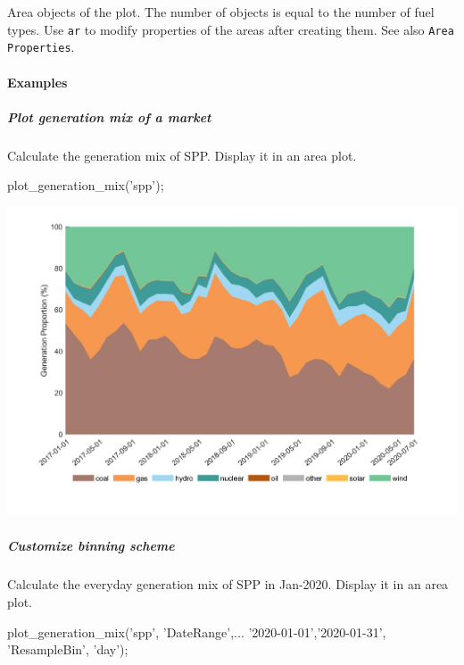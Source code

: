 \documentclass[11pt]{article}
\numberwithin{equation}{section}
\numberwithin{table}{section}
\numberwithin{figure}{section}
\begin{document}
Area objects of the plot. The number of objects is equal to the number of fuel types. Use \verb!ar! to modify properties of the areas after creating them. See also \verb!Area Properties!.



\paragraph{Examples}
\subparagraph{Plot generation mix of a market}

Calculate the generation mix of SPP. Display it in an area plot.

\begin{Code}
  plot_generation_mix('spp');
\end{Code}

\begin{center}
  \noindent\includegraphics[width=\textwidth]{figures/plot_generation_mix_example1.jpg}
\end{center}

\subparagraph{Customize binning scheme}

Calculate the everyday generation mix of SPP in Jan-2020. Display it in an area plot.

\begin{Code}
  plot_generation_mix('spp', 'DateRange',...
  {'2020-01-01','2020-01-31'}, 'ResampleBin', 'day');
\end{Code}
\end{document}
